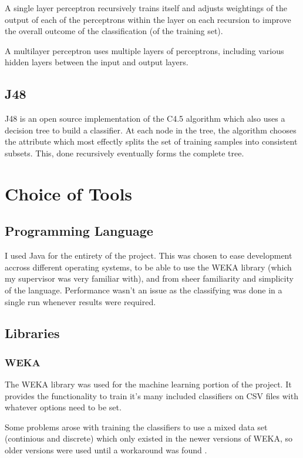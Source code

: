 \documentclass[a4paper,12pt,twoside]{report}
\begin{document}
A single layer perceptron recursively trains itself and adjusts weightings of the output of each of the perceptrons within the layer on each recursion to improve the overall outcome of the classification (of the training set).

A multilayer perceptron uses multiple layers of perceptrons, including various hidden layers between the input and output layers.

\subsection{J48}
J48 is an open source implementation of the C4.5 algorithm which also uses a decision tree to build a classifier. At each node in the tree, the algorithm chooses the attribute which most effectly splits the set of training samples into consistent subsets. This, done recursively eventually forms the complete tree.


\section{Choice of Tools}
\subsection{Programming Language}
I used Java for the entirety of the project. This was chosen to ease development accross different operating systems, to be able to use the WEKA library (which my supervisor was very familiar with), and from sheer familiarity and simplicity of the language. 
Performance wasn't an issue as the classifying was done in a single run whenever results were required. 

\subsection{Libraries}
\subsubsection{WEKA}
The WEKA\cite{x} library was used for the machine learning portion of the project. It provides the functionality to train it's many included classifiers on CSV files with whatever options need to be set. 

Some problems arose with training the classifiers to use a mixed data set (continious and discrete) which only existed in the newer versions of WEKA, so older versions were used until a workaround was found .
\end{document}

